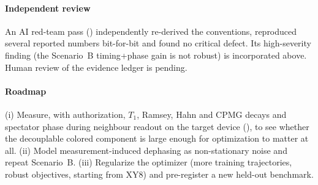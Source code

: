\paragraph{Independent review} An AI red-team pass ()
independently re-derived the conventions, reproduced several reported numbers bit-for-bit and
found no critical defect. Its high-severity finding (the Scenario~B timing+phase gain is not
robust) is incorporated above. Human review of the evidence ledger is pending.

\paragraph{Roadmap} (i) Measure, with authorization, $T_1$, Ramsey, Hahn and CPMG decays and
spectator phase during neighbour readout on the target device
(), to see whether the decouplable colored component is
large enough for optimization to matter at all. (ii) Model measurement-induced dephasing as
non-stationary noise and repeat Scenario~B. (iii) Regularize the optimizer (more training
trajectories, robust objectives, starting from XY8) and pre-register a new held-out benchmark.
